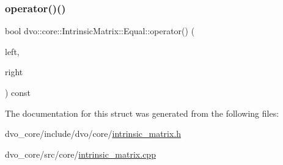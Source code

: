 \subsubsection{\texorpdfstring{operator()()}{operator()()}}
{\footnotesize\ttfamily bool dvo\+::core\+::\+Intrinsic\+Matrix\+::\+Equal\+::operator() (\begin{DoxyParamCaption}\item[{\mbox{\hyperlink{structdvo_1_1core_1_1_intrinsic_matrix}{Intrinsic\+Matrix}} const \&}]{left,  }\item[{\mbox{\hyperlink{structdvo_1_1core_1_1_intrinsic_matrix}{Intrinsic\+Matrix}} const \&}]{right }\end{DoxyParamCaption}) const}



The documentation for this struct was generated from the following files\+:\begin{DoxyCompactItemize}
\item 
dvo\+\_\+core/include/dvo/core/\mbox{\hyperlink{intrinsic__matrix_8h}{intrinsic\+\_\+matrix.\+h}}\item 
dvo\+\_\+core/src/core/\mbox{\hyperlink{intrinsic__matrix_8cpp}{intrinsic\+\_\+matrix.\+cpp}}\end{DoxyCompactItemize}
